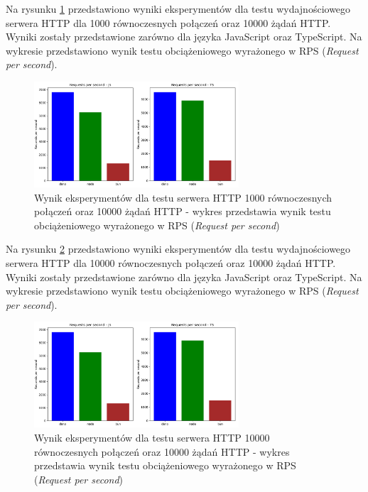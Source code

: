 Na rysunku \ref{fig:server_e2} przedstawiono wyniki eksperymentów dla testu wydajnościowego serwera HTTP dla 1000 równoczesnych połączeń oraz 10000 żądań HTTP. Wyniki zostały przedstawione zarówno dla języka JavaScript oraz TypeScript. Na wykresie przedstawiono wynik testu obciążeniowego wyrażonego w RPS (\textit{Request per second}).

\begin{figure}[H]
  \centering
  \includegraphics[width=0.68\textwidth]{Figures/server/server_1000_10000.png}
  \caption{Wynik eksperymentów dla testu serwera HTTP 1000 równoczesnych połączeń oraz 10000 żądań HTTP - wykres przedstawia wynik testu obciążeniowego wyrażonego w RPS (\textit{Request per second})}
  \label{fig:server_e2}
\end{figure}

Na rysunku \ref{fig:server_e3} przedstawiono wyniki eksperymentów dla testu wydajnościowego serwera HTTP dla 10000 równoczesnych połączeń oraz 10000 żądań HTTP. Wyniki zostały przedstawione zarówno dla języka JavaScript oraz TypeScript. Na wykresie przedstawiono wynik testu obciążeniowego wyrażonego w RPS (\textit{Request per second}).

\begin{figure}[H]
  \centering
  \includegraphics[width=0.68\textwidth]{Figures/server/server_1000_10000.png}
  \caption{Wynik eksperymentów dla testu serwera HTTP 10000 równoczesnych połączeń oraz 10000 żądań HTTP - wykres przedstawia wynik testu obciążeniowego wyrażonego w RPS (\textit{Request per second})}
  \label{fig:server_e3}
\end{figure}

